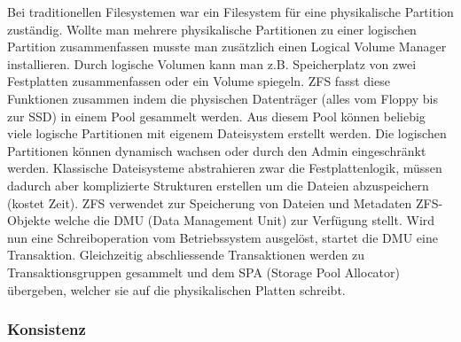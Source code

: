 Bei traditionellen Filesystemen war ein Filesystem für eine physikalische Partition zuständig. Wollte man mehrere physikalische Partitionen zu einer logischen Partition zusammenfassen musste man zusätzlich einen Logical Volume Manager installieren. Durch logische Volumen kann man z.B. Speicherplatz von zwei Festplatten zusammenfassen oder ein Volume spiegeln.
ZFS fasst diese Funktionen zusammen indem die physischen Datenträger (alles vom Floppy bis zur SSD) in einem Pool gesammelt werden. Aus diesem Pool können beliebig viele logische Partitionen mit eigenem Dateisystem erstellt werden. Die logischen Partitionen können dynamisch wachsen oder durch den Admin eingeschränkt werden.
Klassische Dateisysteme abstrahieren zwar die Festplattenlogik, müssen dadurch aber komplizierte Strukturen erstellen um die Dateien abzuspeichern (kostet Zeit). ZFS verwendet zur Speicherung von Dateien und Metadaten ZFS-Objekte welche die DMU (Data Management Unit) zur Verfügung stellt. Wird nun eine Schreiboperation vom Betriebssystem ausgelöst, startet die DMU eine Transaktion. Gleichzeitig abschliessende Transaktionen werden zu Transaktionsgruppen gesammelt und dem SPA (Storage Pool Allocator) übergeben, welcher sie auf die physikalischen Platten schreibt.

\subsubsection{Konsistenz}

